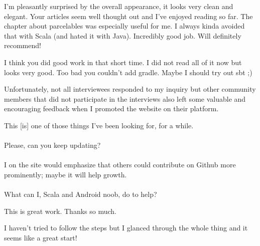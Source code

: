 \hrulefill

\begin{displayquote}

	I'm pleasantly surprised by the overall appearance, it looks very clean and elegant. Your articles seem well thought out and I've enjoyed reading so far. The chapter about parcelables was especially useful for me. I always kinda avoided that with Scala (and hated it with Java). Incredibly good job. Will definitely recommend!

\end{displayquote}

\hrulefill

\begin{displayquote}

	I think you did good work in that short time. I did not read all of it now but looks very good. Too bad you couldn't add gradle. Maybe I should try out sbt ;)

\end{displayquote}

Unfortunately, not all interviewees responded to my inquiry but other community members that did not participate in the interviews also left some valuable and encouraging feedback when I promoted the website on their platform.

\begin{displayquote}

	This [is] one of those things I've been looking for, for a while. \\\\
	Please, can you keep updating? \\\\
	I on the site would emphasize that others could contribute on Github more prominently; maybe it will help growth. \\\\
	What can I, Scala and Android noob, do to help?

\end{displayquote}

\hrulefill

\begin{displayquote}

	This is great work. Thanks so much.

\end{displayquote}

\hrulefill

\begin{displayquote}

	I haven't tried to follow the steps but I glanced through the whole thing and it seems like a great start!

\end{displayquote}

